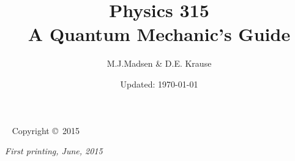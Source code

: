 \documentclass[notitlepage,oneside,openany]{tufte-book}
\title[A Quantum Mechanic's Guide]{Physics 315\\A Quantum Mechanic's Guide} %
\author[Wabash College]{M.J.Madsen \& D.E. Krause} %
\date{Updated: \today}
\begin{document}
\frontmatter



\hypersetup{pageanchor=false}

\maketitle %


\begin{fullwidth}
~\vfill
\thispagestyle{empty}
\setlength{\parindent}{0pt}
\setlength{\parskip}{\baselineskip}
Copyright \copyright\ 2015 \thanklessauthor

\par{}

\par{}


\par\textit{First printing, June, 2015}
\end{fullwidth}

\newpage

\tableofcontents %

\end{document}
